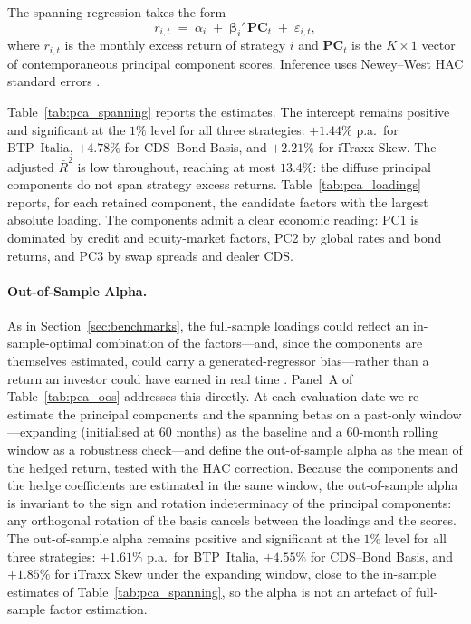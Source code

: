 The spanning regression takes the form
\[
r_{i,t} \;=\; \alpha_i \;+\; \boldsymbol{\beta}_i'\,
\mathbf{PC}_t \;+\; \varepsilon_{i,t},
\]
where $r_{i,t}$ is the monthly excess return of strategy $i$ and
$\mathbf{PC}_t$ is the $K \times 1$ vector of contemporaneous
principal component scores. Inference uses Newey--West HAC standard
errors \citep{newey1987simple}.

Table~\ref{tab:pca_spanning} reports the estimates. The intercept
remains positive and significant at the $1\%$ level for all three
strategies: $+1.44\%$ p.a.\ for BTP~Italia, $+4.78\%$ for CDS--Bond
Basis, and $+2.21\%$ for iTraxx Skew. The adjusted $\bar{R}^2$ is
low throughout, reaching at most $13.4\%$: the diffuse principal
components do not span strategy excess returns.
Table~\ref{tab:pca_loadings} reports, for each retained component, the
candidate factors with the largest absolute loading. The components
admit a clear economic reading: PC1 is dominated by credit and
equity-market factors, PC2 by global rates and bond returns, and PC3
by swap spreads and dealer CDS.

\paragraph{Out-of-Sample Alpha.}

As in Section~\ref{sec:benchmarks}, the full-sample loadings could
reflect an in-sample-optimal combination of the factors---and, since
the components are themselves estimated, could carry a
generated-regressor bias---rather than a return an investor could have
earned in real time \citep{moreira2017volatility,
cederburg2020performance}. Panel~A of
Table~\ref{tab:pca_oos} addresses this directly. At each evaluation
date we re-estimate the principal components and the spanning
betas on a past-only window---expanding (initialised at $60$ months)
as the baseline and a $60$-month rolling window as a robustness
check---and define the out-of-sample alpha as the mean of the hedged
return, tested with the \citet{newey1994automatic} HAC correction.
Because the components and the hedge coefficients are estimated in the
same window, the out-of-sample alpha is invariant to the sign and
rotation indeterminacy of the principal components: any orthogonal
rotation of the basis cancels between the loadings and the scores. 
The out-of-sample alpha remains positive and
significant at the $1\%$ level for all three strategies: $+1.61\%$
p.a.\ for BTP~Italia, $+4.55\%$ for CDS--Bond Basis, and $+1.85\%$ for
iTraxx Skew under the expanding window, close to the in-sample
estimates of Table~\ref{tab:pca_spanning}, so the alpha is not an
artefact of full-sample factor estimation.

